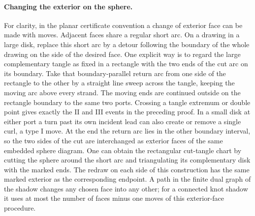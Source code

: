 \paragraph{Changing the exterior on the sphere.}
For clarity, in the planar certificate convention a change of exterior face can be made with moves. Adjacent faces share a regular short arc. On a drawing in a large disk, replace this short arc by a detour following the boundary of the whole drawing on the side of the desired face. One explicit way is to regard the large complementary tangle as fixed in a rectangle with the two ends of the cut arc on its boundary. Take that boundary-parallel return arc from one side of the rectangle to the other by a straight line sweep across the tangle, keeping the moving arc above every strand. The moving ends are continued outside on the rectangle boundary to the same two ports. Crossing a tangle extremum or double point gives exactly the II and III events in the preceding proof. In a small disk at either port a turn past its own incident lead can also create or remove a single curl, a type I move. At the end the return arc lies in the other boundary interval, so the two sides of the cut are interchanged as exterior faces of the same embedded sphere diagram. One can obtain the rectangular cut-tangle chart by cutting the sphere around the short arc and triangulating its complementary disk with the marked ends. The redraw on each side of this construction has the same marked exterior as the corresponding endpoint. A path in the finite dual graph of the shadow changes any chosen face into any other; for a connected knot shadow it uses at most the number of faces minus one moves of this exterior-face procedure.
